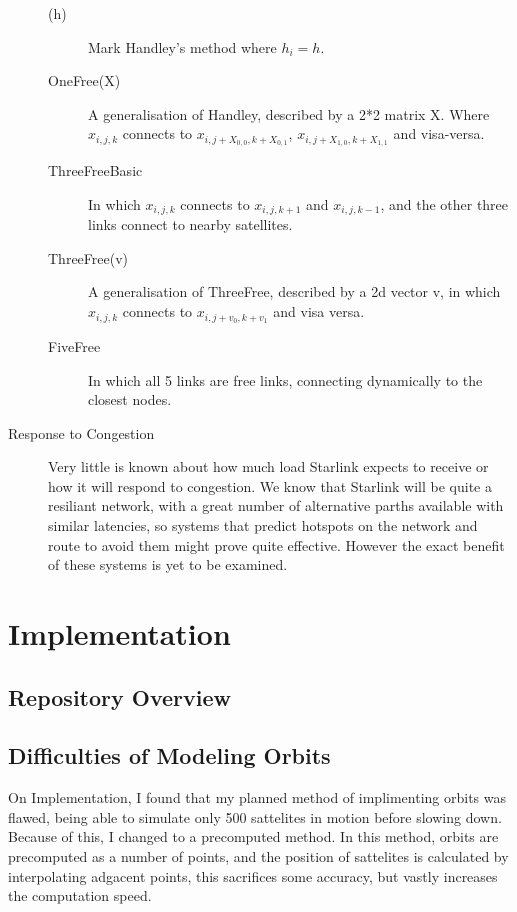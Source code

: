 \documentclass[12pt]{article}
\begin{document}
\begin{description}
\begin{description}
\item[(h)] Mark Handley's method where $h_i = h$.
\item[OneFree(X)] A generalisation of Handley, described by a 2*2 matrix X. Where $x_{i,j,k}$ connects to $x_{i,j+X_{0,0},k+X_{0,1}}$, $x_{i,j+X_{1,0},k+X_{1,1}}$ and visa-versa.
\item[ThreeFreeBasic] In which $x_{i,j,k}$ connects to $x_{i,j,k+1}$ and $x_{i,j,k-1}$, and the other three links connect to nearby satellites.
\item[ThreeFree(v)] A generalisation of ThreeFree, described by a 2d vector v, in which $x_{i,j,k}$ connects to $x_{i,j+v_0,k+v_1}$ and visa versa.
\item[FiveFree] In which all 5 links are free links, connecting dynamically to the closest nodes.
\end{description}

\item[Response to Congestion]
Very little is known about how much load Starlink expects to receive or how it will respond to congestion. We know that Starlink will be quite a resiliant network, with a great number of alternative parths available with similar latencies, so systems that predict hotspots on the network and route to avoid them might prove quite effective. However the exact benefit of these systems is yet to be examined.
\end{description}

\section{Implementation}

\subsection{Repository Overview}

\subsection{Difficulties of Modeling Orbits}
On Implementation, I found that my planned method of implimenting orbits was flawed, being able to simulate only 500 sattelites in motion before slowing down. Because of this, I changed to a precomputed method. In this method, orbits are precomputed as a number of points, and the position of sattelites is calculated by interpolating adgacent points, this sacrifices some accuracy, but vastly increases the computation speed.
\end{document}

